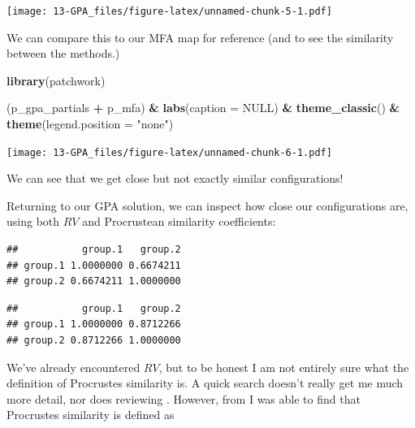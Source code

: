 \documentclass[
]{book}
\newenvironment{Shaded}{\begin{snugshade}}{\end{snugshade}}
\newcommand{\AttributeTok}[1]{\textcolor[rgb]{0.13,0.29,0.53}{#1}}
\newcommand{\ConstantTok}[1]{\textcolor[rgb]{0.56,0.35,0.01}{#1}}
\newcommand{\FunctionTok}[1]{\textcolor[rgb]{0.13,0.29,0.53}{\textbf{#1}}}
\newcommand{\NormalTok}[1]{#1}
\newcommand{\SpecialCharTok}[1]{\textcolor[rgb]{0.81,0.36,0.00}{\textbf{#1}}}
\newcommand{\StringTok}[1]{\textcolor[rgb]{0.31,0.60,0.02}{#1}}
\begin{document}
\texttt{[image: 13-GPA\_files/figure-latex/unnamed-chunk-5-1.pdf]}

We can compare this to our MFA map for reference (and to see the similarity between the methods.)

\begin{Shaded}
\begin{Highlighting}[]
\FunctionTok{library}\NormalTok{(patchwork)}

\NormalTok{(p\_gpa\_partials }\SpecialCharTok{+}\NormalTok{ p\_mfa) }\SpecialCharTok{\&} 
  \FunctionTok{labs}\NormalTok{(}\AttributeTok{caption =} \ConstantTok{NULL}\NormalTok{) }\SpecialCharTok{\&}
  \FunctionTok{theme\_classic}\NormalTok{() }\SpecialCharTok{\&}
  \FunctionTok{theme}\NormalTok{(}\AttributeTok{legend.position =} \StringTok{"none"}\NormalTok{)}
\end{Highlighting}
\end{Shaded}

\texttt{[image: 13-GPA\_files/figure-latex/unnamed-chunk-6-1.pdf]}

We can see that we get close but not exactly similar configurations!

Returning to our GPA solution, we can inspect how close our configurations are, using both \(RV\) and Procrustean similarity coefficients:

\begin{Shaded}
\end{Shaded}

\begin{verbatim}
##           group.1   group.2
## group.1 1.0000000 0.6674211
## group.2 0.6674211 1.0000000
\end{verbatim}

\begin{Shaded}
\end{Shaded}

\begin{verbatim}
##           group.1   group.2
## group.1 1.0000000 0.8712266
## group.2 0.8712266 1.0000000
\end{verbatim}

We've already encountered \(RV\), but to be honest I am not entirely sure what the definition of Procrustes similarity is. A quick search doesn't really get me much more detail, nor does reviewing \citet{gowerGeneralized1975}. However, from \citet{qannariPerformance1998} I was able to find that Procrustes similarity is defined as
\end{document}
